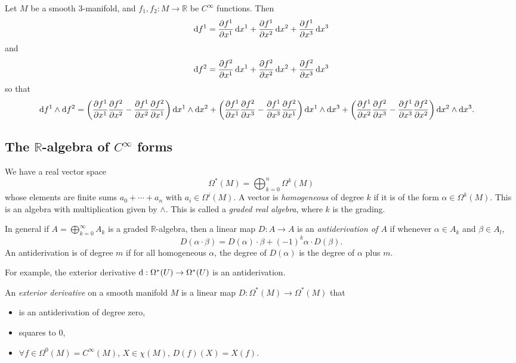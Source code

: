 \begin{xmpl}
Let $M$ be a smooth 3-manifold, and
$f_1, f_2 : M \to \mathbb{R}$ be $C^\infty$ functions. Then
$$
  \mathop{}\!\mathrm{d} f^1
= \frac{\partial f^1}{\partial x^1} \mathop{}\!\mathrm{d} x^1
+ \frac{\partial f^1}{\partial x^2} \mathop{}\!\mathrm{d} x^2
+ \frac{\partial f^1}{\partial x^3} \mathop{}\!\mathrm{d} x^3
$$
and
$$
  \mathop{}\!\mathrm{d} f^2
= \frac{\partial f^2}{\partial x^1} \mathop{}\!\mathrm{d} x^1
+ \frac{\partial f^2}{\partial x^2} \mathop{}\!\mathrm{d} x^2
+ \frac{\partial f^2}{\partial x^3} \mathop{}\!\mathrm{d} x^3
$$
so that
\begin{align*}
   \dif f^1 \wedge \dif f^2
&= \left(
     \frac{\partial f^1}{\partial x^1}
     \frac{\partial f^2}{\partial x^2}
   - \frac{\partial f^1}{\partial x^2}
     \frac{\partial f^2}{\partial x^1}
   \right)
   \dif x^1 \wedge \dif x^2
 +  \left(
     \frac{\partial f^1}{\partial x^1}
     \frac{\partial f^2}{\partial x^3}
   - \frac{\partial f^1}{\partial x^3}
     \frac{\partial f^2}{\partial x^1}
   \right)
   \dif x^1 \wedge \dif x^3
 +  \left(
     \frac{\partial f^1}{\partial x^2}
     \frac{\partial f^2}{\partial x^3}
   - \frac{\partial f^1}{\partial x^3}
     \frac{\partial f^2}{\partial x^2}
   \right)
   \dif x^2 \wedge \dif x^3.
\end{align*}

\end{xmpl}

\subsection{The $\mathbb{R}$-algebra of $C^\infty$ forms}
We have a real vector space
$$
  \Omega^\ast(M)
= \bigoplus_{k=0}^n
    \Omega^k(M)
$$
whose elements are finite sums $a_0 + \cdots + a_n$ with
$a_i \in \Omega^i(M)$. A vector is \emph{homogeneous}
of degree $k$ if it is of the form
$\alpha \in \Omega^k(M)$. This is an algebra with multiplication given
by $\wedge$. This is called a \emph{graded real algebra}, where $k$ is
the grading.

\begin{defn}
In general if $A = \bigoplus_{k=0}^\infty A_k$ is a graded
$\mathbb{R}$-algebra, then a linear map
$D: A \to A$ is an \emph{antiderivation of $A$} if whenever
$\alpha \in A_k$ and $\beta \in A_l$,
$$
  D(\alpha \cdot \beta)
= D(\alpha)\cdot\beta + (-1)^k \alpha \cdot D(\beta).
$$
An antiderivation is of degree $m$ if for all homogeneous
$\alpha$, the degree of $D(\alpha)$ is the degree of $\alpha$ plus
$m$.
\end{defn}

For example, the exterior derivative
$\mathop{}\!\mathrm{d} : \Omega^\ast(U) \to \Omega^\ast(U)$ is an antiderivation.

\begin{defn}
An \emph{exterior derivative} on a smooth manifold $M$ is a linear map
$D: \Omega^\ast(M) \to \Omega^\ast(M)$ that
\begin{itemize}
  \item{is an antiderivation of degree zero,}
  \item{squares to 0,}
  \item{
    $\forall f \in \Omega^0(M) = C^\infty(M)$,
    $X \in \chi(M)$,
    $D(f)(X) = X(f)$.
  }
\end{itemize}
\end{defn}
